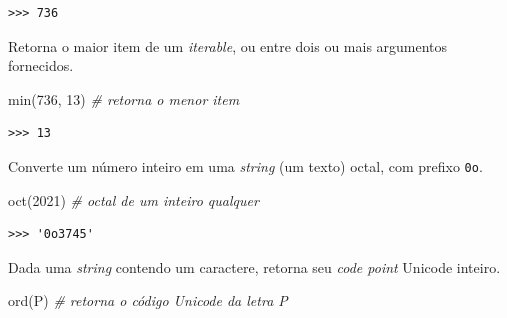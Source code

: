 \documentclass[
]{book}
\newenvironment{Shaded}{\begin{snugshade}}{\end{snugshade}}
\newcommand{\BuiltInTok}[1]{#1}
\newcommand{\CommentTok}[1]{\textcolor[rgb]{0.56,0.35,0.01}{\textit{#1}}}
\newcommand{\DecValTok}[1]{\textcolor[rgb]{0.00,0.00,0.81}{#1}}
\newcommand{\NormalTok}[1]{#1}
\newcommand{\StringTok}[1]{\textcolor[rgb]{0.31,0.60,0.02}{#1}}
\providecommand{\tightlist}{%
  \setlength{\itemsep}{0pt}\setlength{\parskip}{0pt}}
\begin{document}
\begin{verbatim}
>>> 736
\end{verbatim}

\begin{description}
\tightlist
\item[\texttt{min(arg0,\ *arg1)}]
Retorna o maior item de um \emph{iterable}, ou entre dois ou mais argumentos fornecidos.
\end{description}

\begin{Shaded}
\begin{Highlighting}[]
\BuiltInTok{min}\NormalTok{(}\DecValTok{736}\NormalTok{, }\DecValTok{13}\NormalTok{) }\CommentTok{\# retorna o menor item}
\end{Highlighting}
\end{Shaded}

\begin{verbatim}
>>> 13
\end{verbatim}

\begin{description}
\tightlist
\item[\texttt{oct(x)}]
Converte um número inteiro em uma \emph{string} (um texto) octal, com prefixo \texttt{0o}.
\end{description}

\begin{Shaded}
\begin{Highlighting}[]
\BuiltInTok{oct}\NormalTok{(}\DecValTok{2021}\NormalTok{) }\CommentTok{\# octal de um inteiro qualquer}
\end{Highlighting}
\end{Shaded}

\begin{verbatim}
>>> '0o3745'
\end{verbatim}

\begin{description}
\tightlist
\item[\texttt{ord(c)}]
Dada uma \emph{string} contendo um caractere, retorna seu \emph{code point} Unicode inteiro.
\end{description}

\begin{Shaded}
\begin{Highlighting}[]
\BuiltInTok{ord}\NormalTok{(}\StringTok{\textquotesingle{}P\textquotesingle{}}\NormalTok{) }\CommentTok{\# retorna o código Unicode da letra P}
\end{Highlighting}
\end{Shaded}
\end{document}

